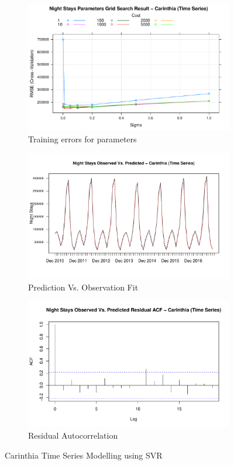 \documentclass[a4paper,reqno,]{article}
\begin{document}
\begin{figure}[h!]
  \centering
  \begin{subfigure}[b]{0.32\linewidth}
    \includegraphics[width=\linewidth]{images/SVR/CarinthiaGrid.pdf}
    \caption{Training errors for parameters}
  \end{subfigure}
  \begin{subfigure}[b]{0.32\linewidth}
    \includegraphics[width=\linewidth]{images/SVR/CarinthiaTimeSeries.pdf}
    \caption{Prediction Vs. Observation Fit}
  \end{subfigure}
  \begin{subfigure}[b]{0.32\linewidth}
    \includegraphics[width=\linewidth]{images/SVR/CarinthiaACF.pdf}
    \caption{Residual Autocorrelation}
  \end{subfigure}
  \caption{Carinthia Time Series Modelling using SVR}
  \label{fig:Time Series}
\end{figure}
\end{document}
